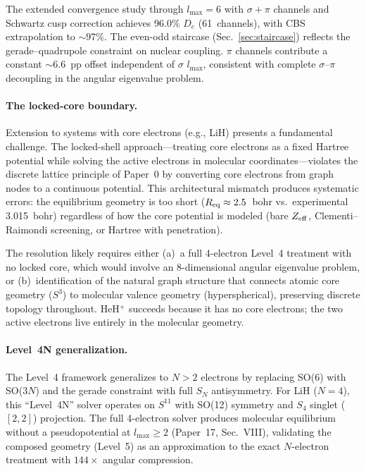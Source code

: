 \documentclass[aps,pra,twocolumn,superscriptaddress,longbibliography]{revtex4-2}
\begin{document}
The extended convergence study through $l_{\max} = 6$ with
$\sigma{+}\pi$ channels and Schwartz cusp correction achieves 96.0\%
$D_e$ (61~channels), with CBS extrapolation to ${\sim}97\%$.
The even-odd staircase (Sec.~\ref{sec:staircase}) reflects the
gerade--quadrupole constraint on nuclear coupling.
$\pi$ channels contribute a constant ${\sim}6.6$~pp offset
independent of $\sigma$ $l_{\max}$, consistent with complete
$\sigma$--$\pi$ decoupling in the angular eigenvalue problem.

\paragraph{The locked-core boundary.}
Extension to systems with core electrons (e.g., LiH) presents a
fundamental challenge.  The locked-shell approach---treating core
electrons as a fixed Hartree potential while solving the active electrons
in molecular coordinates---violates the discrete lattice principle of
Paper~0 by converting core electrons from graph nodes to a continuous
potential.  This architectural mismatch produces systematic errors: the
equilibrium geometry is too short ($R_{\rm eq} \approx 2.5$~bohr vs.\
experimental 3.015~bohr) regardless of how the core potential is modeled
(bare $Z_{\rm eff}$, Clementi--Raimondi screening, or Hartree with
penetration).

The resolution likely requires either (a)~a full 4-electron Level~4
treatment with no locked core, which would involve an 8-dimensional
angular eigenvalue problem, or (b)~identification of the natural graph
structure that connects atomic core geometry ($S^3$) to molecular valence
geometry (hyperspherical), preserving discrete topology throughout.
HeH$^+$ succeeds because it has no core electrons; the two active
electrons live entirely in the molecular geometry.

\paragraph{Level~4N generalization.}
The Level~4 framework generalizes to $N > 2$ electrons by replacing
SO(6) with SO($3N$) and the gerade constraint with full $S_N$
antisymmetry.  For LiH ($N=4$), this ``Level~4N'' solver operates
on $S^{11}$ with SO(12) symmetry and $S_4$ singlet ($[2,2]$)
projection.  The full 4-electron solver produces molecular equilibrium
without a pseudopotential at $l_{\max} \geq 2$ (Paper~17, Sec.~VIII),
validating the composed geometry (Level~5) as an approximation to the
exact $N$-electron treatment with $144{\times}$ angular compression.
\end{document}
